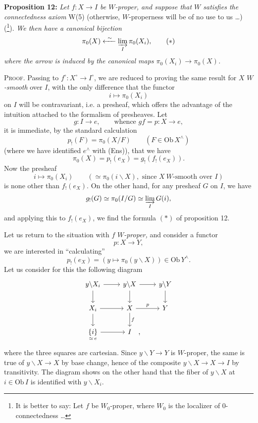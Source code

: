\documentclass[11pt]{article}
\newcommand{\printedpage}[1]{\marginpar{\footnotesize p.~#1}}
\newcommand{\msp}[1]{\marginpar{\footnotesize [#1]}}
\begin{document}
\textbf{Proposition 12:} \textit{Let $f : X \longrightarrow I$ be $W$-proper, and suppose that $W$ satisfies the connectedness axiom} W(5) (otherwise, $W$-properness will be of no use to us \dots) (\footnote[81]{It is better to say: Let $f$ be $W_0$-proper, where $W_0$ is the localizer of 0-connectedness \dots}). \textit{We then have a canonical bijection}
\[
\pi_0(X) \xleftarrow{\ \sim\ } \varinjlim_{I} \pi_0(X_i), \tag*{$(*)$}
\]
\textit{where the arrow is induced by the canonical maps $\pi_0(X_i) \longrightarrow \pi_0(X)$.}

\textsc{Proof.} Passing to $f^\circ : X^\circ \longrightarrow I^\circ$, we are reduced to proving the same result for $X$ \textit{$W$-smooth} over $I$, with the only difference that the functor
\[
i \longmapsto \pi_0(X_i)
\]
on $I$ will be contravariant, i.e. a presheaf, which offers the advantage of the intuition attached to the formalism of presheaves. Let
\[
g : I \longrightarrow e, \qquad \text{whence } gf = p : X \longrightarrow e,
\]
it is immediate, by the standard calculation
\[
p_!(F) = \pi_0(X/F) \qquad (F \in \mathrm{Ob}\, X^\wedge)
\]
(where we have identified $e^\wedge$ with (Ens)), that we have
\[
\pi_0(X) = p_!(e_X) = g_!(f_!(e_X)).
\]
Now the presheaf
\[
i \longmapsto \pi_0(X_i) \qquad (\simeq \pi_0(i\backslash X), \text{ since } X\ W\text{-smooth over } I)
\]
\msp{page 117}
is none other than $f_!(e_X)$. On the other hand, for any presheaf $G$ on $I$, we have
\[
g_!(G) \simeq \pi_0(I/G) \simeq \varinjlim_{I} G(i),
\]
and applying this to $f_!(e_X)$, we find the formula $(*)$ of proposition 12.

Let us return to the situation with $f$ \textit{$W$-proper,} and consider a functor
\[
p : X \longrightarrow Y,
\]
we are interested in ``calculating''
\[
p_!(e_X) = (y \longmapsto \pi_0(y\backslash X)) \in \mathrm{Ob}\, Y^\wedge.
\]
Let us consider for this the following diagram
\printedpage{80}
\[
\begin{tikzcd}
y\backslash X_i \arrow[r] \arrow[d] & y\backslash X \arrow[r] \arrow[d] & y\backslash Y \arrow[d] \\
X_i \arrow[r] \arrow[d] & X \arrow[r, "p"] \arrow[d, "f"] & Y \\
\underset{\simeq\, e}{\{i\}} \arrow[r] & I\rlap{\quad ,} &
\end{tikzcd}
\]
where the three squares are cartesian. Since $y\backslash Y \longrightarrow Y$ is $W$-proper, the same is true of $y\backslash X \longrightarrow X$ by base change, hence of the composite $y\backslash X \longrightarrow X \longrightarrow I$ by transitivity. The diagram shows on the other hand that the fiber of $y\backslash X$ at $i \in \mathrm{Ob}\, I$ is identified with $y\backslash X_i$.
\end{document}
